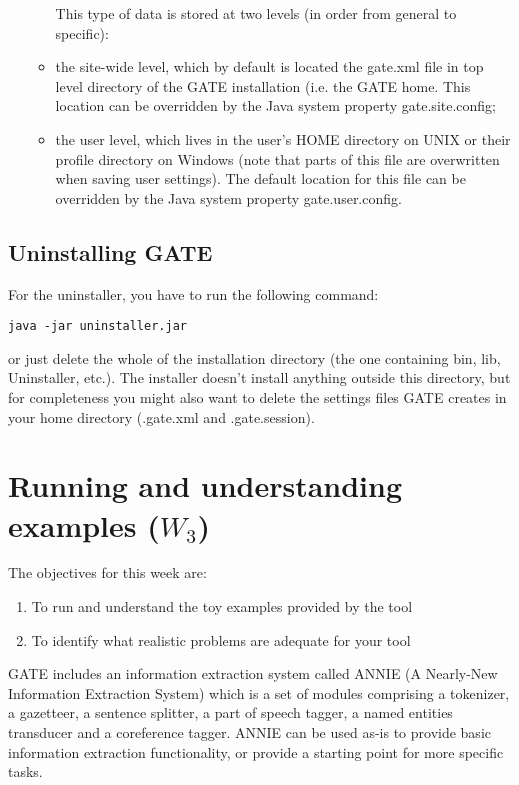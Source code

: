 \documentclass[a4paper,12pt]{report}
\begin{document}
\begin{enumerate}
\begin{itemize}
This type of data is stored at two levels (in order from general to specific): 
 \item the site-wide level, which by default is located the gate.xml file in top level directory 
of the GATE installation (i.e. the GATE home. This location can be overridden by the 
Java system property gate.site.config; 
 \item the user level, which lives in the user’s HOME directory on UNIX or their profile 
directory on Windows (note that parts of this file are overwritten when saving user 
settings). The default location for this file can be overridden by the Java system 
property gate.user.config.\end{itemize}

\end{enumerate}

\section{Uninstalling GATE}

For the uninstaller, you have to run the following command:
\begin{verbatim}
java -jar uninstaller.jar
\end{verbatim}

or just delete the whole of the installation directory (the one containing bin, lib, Uninstaller,
etc.). The installer doesn’t install anything outside this directory, but for completeness you
might also want to delete the settings files GATE creates in your home directory (.gate.xml
and .gate.session).


\chapter{Running and understanding examples ($W_3$)}
The objectives for this week are:
\begin{enumerate}
 \item To run and understand the toy examples provided by the tool
\item To identify what realistic problems are adequate for your tool 
\end{enumerate}


GATE includes an information extraction system called ANNIE (A Nearly-New Information Extraction System) which is a set of modules comprising a tokenizer, a gazetteer, a sentence splitter, a part of speech tagger, a named entities transducer and a coreference tagger. ANNIE can be used as-is to provide basic information extraction functionality, or provide a starting point for more specific tasks.
\end{document}
